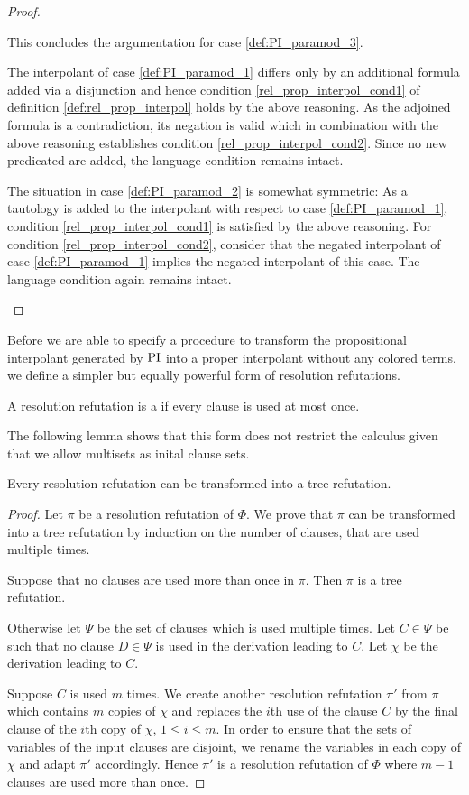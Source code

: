 \begin{proof}
\begin{itemize}
			This concludes the argumentation for case \ref{def:PI_paramod_3}. 

			The interpolant of case \ref{def:PI_paramod_1} differs only by an additional formula added via a disjunction and hence condition \ref{rel_prop_interpol_cond1} of definition \ref{def:rel_prop_interpol} holds by the above reasoning.
			As the adjoined formula is a contradiction, its negation is valid which in combination with the above reasoning establishes condition \ref{rel_prop_interpol_cond2}.
			Since no new predicated are added, the language condition remains intact. 

			The situation in case \ref{def:PI_paramod_2} is somewhat symmetric: 
			As a tautology is added to the interpolant with respect to case \ref{def:PI_paramod_1}, condition \ref{rel_prop_interpol_cond1} is satisfied by the above reasoning.
			For condition \ref{rel_prop_interpol_cond2}, consider that the negated interpolant of case \ref{def:PI_paramod_1} implies the negated interpolant of this case.
			The language condition again remains intact.
			\qedhere
	\end{itemize}
\end{proof}

Before we are able to specify a procedure to transform the propositional interpolant generated by $\operatorname{PI}$ into a proper interpolant without any colored terms, we define a simpler but equally powerful form of resolution refutations.

\begin{defi}
	A resolution refutation is a  if every clause is used at most once.
\end{defi}

The following lemma shows that this form does not restrict the calculus given that we allow multisets as inital clause sets.
\begin{lemma}
	\label{lemma:bin_tree_deduction}
	Every resolution refutation can be transformed into a tree refutation. 
\end{lemma}
\begin{proof}
	Let $\pi$ be a resolution refutation of $\Phi$.
	We prove that $\pi$ can be transformed into a tree refutation by induction on the number of clauses, that are used multiple times.

	Suppose that no clauses are used more than once in $\pi$. Then $\pi$ is a tree refutation.

	Otherwise let $\Psi$ be the set of clauses which is used multiple times.
	Let $C \in \Psi$ be such that no clause $D \in \Psi$ is used in the derivation leading to $C$. 
	Let $\chi$ be the derivation leading to $C$.

	Suppose $C$ is used $m$ times.
	We create another resolution refutation $\pi'$ from $\pi$ which contains $m$ copies of $\chi$ and replaces the $i$th use of the clause $C$ by the final clause of the $i$th copy of $\chi$, $1 \leq i \leq m$.
	In order to ensure that the sets of variables of the input clauses are disjoint, we rename the variables in each copy of $\chi$ and adapt $\pi'$ accordingly.
	Hence $\pi'$ is a resolution refutation of $\Phi$ where $m-1$ clauses are used more than once.
\end{proof}

